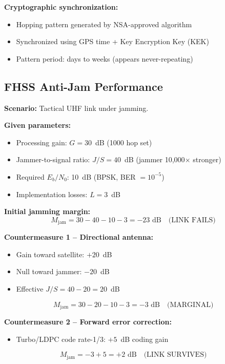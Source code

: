 \textbf{Cryptographic synchronization:}
\begin{itemize}
\item Hopping pattern generated by NSA-approved algorithm
\item Synchronized using GPS time + Key Encryption Key (KEK)
\item Pattern period: days to weeks (appears never-repeating)
\end{itemize}

\subsection{FHSS Anti-Jam Performance}

\textbf{Scenario:} Tactical UHF link under jamming.

\textbf{Given parameters:}
\begin{itemize}
\item Processing gain: $G = 30$~dB (1000 hop set)
\item Jammer-to-signal ratio: $J/S = 40$~dB (jammer 10,000$\times$ stronger)
\item Required $E_b/N_0$: 10~dB (BPSK, BER $= 10^{-5}$)
\item Implementation losses: $L = 3$~dB
\end{itemize}

\textbf{Initial jamming margin:}
\begin{equation}
M_{\text{jam}} = 30 - 40 - 10 - 3 = -23 \text{ dB} \quad \text{(LINK FAILS)}
\end{equation}

\textbf{Countermeasure 1 -- Directional antenna:}
\begin{itemize}
\item Gain toward satellite: $+20$~dB
\item Null toward jammer: $-20$~dB
\item Effective $J/S = 40 - 20 = 20$~dB
\end{itemize}
\begin{equation}
M_{\text{jam}} = 30 - 20 - 10 - 3 = -3 \text{ dB} \quad \text{(MARGINAL)}
\end{equation}

\textbf{Countermeasure 2 -- Forward error correction:}
\begin{itemize}
\item Turbo/LDPC code rate-1/3: $+5$~dB coding gain
\end{itemize}
\begin{equation}
M_{\text{jam}} = -3 + 5 = +2 \text{ dB} \quad \text{(LINK SURVIVES)}
\end{equation}

